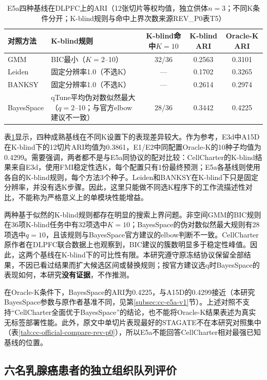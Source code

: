 \begin{table}[htbp]
\centering
\caption{E5a四种基线在DLPFC上的ARI（12张切片等权均值，独立供体$n=3$；不同K条件分开；K-blind规则与命中上界次数来源REV\_P0表T5）}
\label{tab:cellcharter-e5a-v1}
\small
\begin{tabularx}{\linewidth}{lXccc}
\toprule
对照方法 & K-blind规则 & K-blind命中$K=10$ & K-blind ARI & Oracle-K ARI\\
\midrule
GMM & BIC最小（$K=2$--10） & 32/36 & 0.2563 & 0.3101\\
Leiden & 固定分辨率1.0（不选K） & --- & 0.1702 & 0.3265\\
BANKSY & 固定分辨率1.0（不选K） & --- & 0.2614 & 0.2974\\
BayesSpace & qTune平均伪对数似然最大（$q=2$--10；与官方elbow建议不一致） & 28/36 & 0.3442 & 0.4225\\
\bottomrule
\end{tabularx}
\end{table}

表\ref{tab:cellcharter-e5a-v1}显示，四种成熟基线在不同K设置下的表现差异较大。作为参考，E3d中A15D在K-blind下的12切片ARI均值为0.3861，E1/E2中同配置Oracle-K的10种子均值为0.4299。需要强调，两者都不是与E5a同协议的配对比较：CellCharter的K-blind结果来自E3d，使用FMI稳定性选K，每个配置只有1份最终预测；E5a各基线则使用各自的K-blind规则，每个方法3个种子。Leiden和BANKSY在K-blind下只是固定分辨率，并没有选K步骤。因此，这里只能做不同选K程序下的工作流描述性对比，不能称为严格意义上的单模块性能增益。

两种基于似然的K-blind规则都存在明显的搜索上界问题。非空间GMM的BIC规则在36项K-blind任务中有32项选中$K=10$；BayesSpace的伪对数似然最大规则有28项选中$q=10$，且该规则与BayesSpace官方建议的elbow判断不一致\cite{bayesspacevignette}。CellCharter原作者在DLPFC联合数据上也观察到，BIC建议的簇数明显多于稳定性峰值\cite{varrone2024}。因此，这两个基线在K-blind下的可比性有限。本研究遵守原冻结协议保留全部结果，不因已看过结果而扩大候选区间或替换规则；按官方建议选q时BayesSpace的表现如何，本研究\textbf{没有证据}，不作推测。

在Oracle-K条件下，BayesSpace的ARI为0.4225，与A15D的0.4299接近（本研究BayesSpace参数与原作者基准不同，见第\ref{subsec:cc-e5a-v1}节）。上述对照不支持“CellCharter全面优于BayesSpace”的结论，也不能将Oracle-K结果表述为真实无标签部署性能。此外，原文中单切片表现最好的STAGATE不在本研究对照集中（表\ref{tab:cc-official-compare-rev-p0}），所以E5a不能回答CellCharter相对最强已知基线的位置。

\subsection{六名乳腺癌患者的独立组织队列评价}
\label{subsec:cellcharter-e5b-v1}

